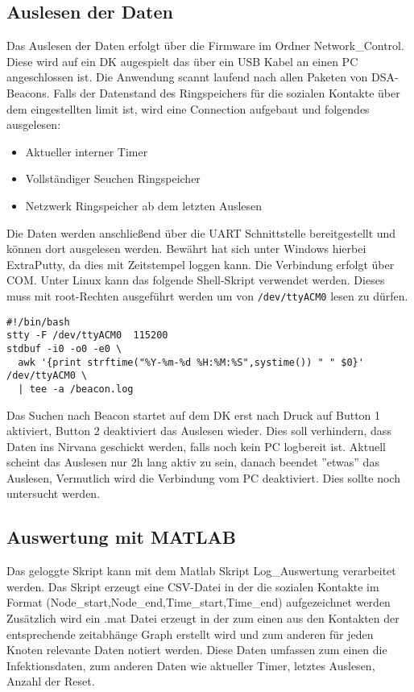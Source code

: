 \documentclass[11pt,ngerman]{scrartcl} %
\begin{document}
\subsection{Auslesen der Daten}

Das Auslesen der Daten erfolgt über die Firmware im Ordner Network\_Control. Diese wird auf ein DK augespielt das über ein USB Kabel an einen PC angeschlossen ist. Die Anwendung scannt laufend nach allen Paketen von DSA-Beacons. Falls der Datenstand des Ringspeichers für die sozialen Kontakte über dem eingestellten limit ist, wird eine Connection aufgebaut und folgendes ausgelesen:
\begin{itemize}
\item Aktueller interner Timer
\item Vollständiger Seuchen Ringspeicher
\item Netzwerk Ringspeicher ab dem letzten Auslesen
\end{itemize}

Die Daten werden anschließend über die UART Schnittstelle bereitgestellt und können dort ausgelesen werden. Bewährt hat sich unter Windows hierbei ExtraPutty, da dies mit Zeitstempel loggen kann. Die Verbindung erfolgt über COM. Unter Linux kann das folgende Shell-Skript verwendet werden. Dieses muss mit root-Rechten ausgeführt werden um von \verb|/dev/ttyACM0| lesen zu dürfen.

\begin{verbatim}
#!/bin/bash
stty -F /dev/ttyACM0  115200
stdbuf -i0 -o0 -e0 \
  awk '{print strftime("%Y-%m-%d %H:%M:%S",systime()) " " $0}' /dev/ttyACM0 \
  | tee -a /beacon.log
\end{verbatim}

Das Suchen nach Beacon startet auf dem DK erst nach Druck auf Button 1 aktiviert, Button 2 deaktiviert das Auslesen wieder. Dies soll verhindern, dass Daten ins Nirvana geschickt werden, falls noch kein PC logbereit ist.
Aktuell scheint das Auslesen nur 2h lang aktiv zu sein, danach beendet ''etwas'' das Auslesen, Vermutlich wird die Verbindung vom PC deaktiviert. Dies sollte noch untersucht werden.

\subsection{Auswertung mit MATLAB}

Das geloggte Skript kann mit dem Matlab Skript Log\_Auswertung verarbeitet werden. Das Skript erzeugt eine CSV-Datei in der die sozialen Kontakte im Format (Node\_start,Node\_end,Time\_start,Time\_end)  aufgezeichnet werden
Zusätzlich wird ein .mat Datei erzeugt in der zum einen aus den Kontakten der entsprechende zeitabhänge Graph erstellt wird und zum anderen für jeden Knoten relevante Daten notiert werden. Diese Daten umfassen zum einen die Infektionsdaten, zum anderen Daten wie aktueller Timer, letztes Auslesen, Anzahl der Reset. 
\end{document}
